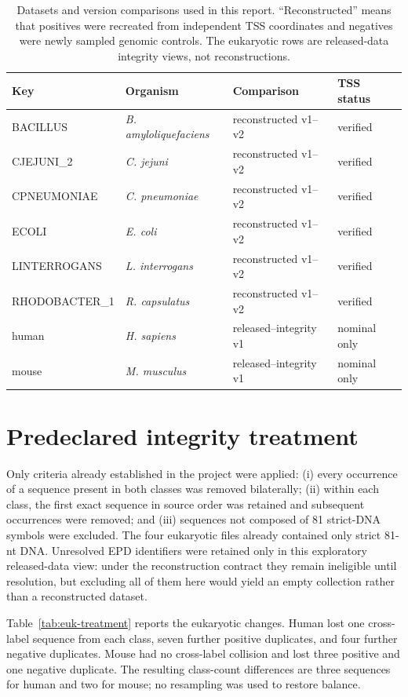 \documentclass[11pt]{article}
\begin{document}
\begin{table}[H]
\centering
\caption{Datasets and version comparisons used in this report. ``Reconstructed'' means that positives were recreated from independent TSS coordinates and negatives were newly sampled genomic controls. The eukaryotic rows are released-data integrity views, not reconstructions.}
\label{tab:inventory}
\small
\begin{tabular}{llll}
\toprule
Key & Organism & Comparison & TSS status \\
\midrule
BACILLUS & \textit{B. amyloliquefaciens} & reconstructed v1--v2 & verified \\
CJEJUNI\_2 & \textit{C. jejuni} & reconstructed v1--v2 & verified \\
CPNEUMONIAE & \textit{C. pneumoniae} & reconstructed v1--v2 & verified \\
ECOLI & \textit{E. coli} & reconstructed v1--v2 & verified \\
LINTERROGANS & \textit{L. interrogans} & reconstructed v1--v2 & verified \\
RHODOBACTER\_1 & \textit{R. capsulatus} & reconstructed v1--v2 & verified \\
human & \textit{H. sapiens} & released--integrity v1 & nominal only \\
mouse & \textit{M. musculus} & released--integrity v1 & nominal only \\
\bottomrule
\end{tabular}
\end{table}

\section{Predeclared integrity treatment}

Only criteria already established in the project were applied: (i) every
occurrence of a sequence present in both classes was removed bilaterally;
(ii) within each class, the first exact sequence in source order was retained
and subsequent occurrences were removed; and (iii) sequences not composed of
81 strict-DNA symbols were excluded. The four eukaryotic files already
contained only strict 81-nt DNA. Unresolved EPD identifiers were retained only
in this exploratory released-data view: under the reconstruction contract they
remain ineligible until resolution, but excluding all of them here would yield
an empty collection rather than a reconstructed dataset.

Table~\ref{tab:euk-treatment} reports the eukaryotic changes. Human lost one
cross-label sequence from each class, seven further positive duplicates, and
four further negative duplicates. Mouse had no cross-label collision and lost
three positive and one negative duplicate. The resulting class-count
differences are three sequences for human and two for mouse; no resampling was
used to restore balance.
\end{document}
